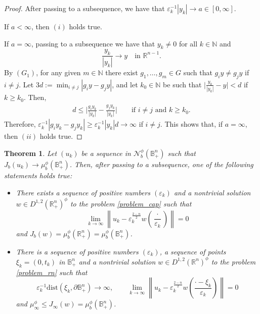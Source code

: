 \documentclass[reqno,11pt,oneside]{amsart}
\newtheorem{theorem}{Theorem}[section]
\numberwithin{equation}{section}
\def\D{\mathbb{B}^n_+}
\def\r{\mathbb{R}}
\def\rn{\mathbb{R}^n}
\def\hn{\mathbb{R}^n_+}
\def\n{\mathbb{N}}
\def\eps{\varepsilon}
\def\cN{\mathcal{N}}
\def\dist{\mathrm{dist}}
\begin{document}
\begin{proof}
After passing to a subsequence, we have that $\eps_k^{-1}|y_k|\to a\in[0,\infty]$. 

If $a<\infty$, then $(i)$ holds true. 

If $a=\infty$, passing to a subsequence we have that $y_k\neq 0$ for all $k\in\n$ and
$$\frac{y_k}{|y_k|}\to y\quad\text{in \ }\r^{n-1}.$$
By $(G_1)$, for any given $m\in\n$ there exist $g_1,\ldots,g_m\in G$ such that $g_iy\neq g_jy$ if $i\neq j$. Let $3d:=\min_{i\neq j}|g_iy-g_jy|$, and let $k_0\in\n$ be such that
$\big|\frac{y_k}{|y_k|}-y\big|<d$ if $k\geq k_0$. Then,
\begin{align*}
d\leq \Big|\frac{g_iy_k}{|y_k|}-\frac{g_jy_k}{|y_k|}\Big|\qquad\text{if \ }i\neq j\text{ \ and \ }k\geq k_0.
\end{align*}
Therefore, $\eps_k^{-1}|g_iy_k-g_jy_k|\geq\eps_k^{-1}|y_k|d\to\infty$ if $i\neq j$. This shows that, if $a=\infty$, then $(ii)$ holds true.
\end{proof}


\begin{theorem} \label{thm:minimizing}
Let $(u_k)$ be a sequence in $\cN_b^\phi(\D)$ such that $J_b(u_k)\to \mu^\phi_b(\D)$. Then, after passing to a subsequence, one of the following statements holds true:
\begin{itemize}
\item[$(I)$] There exists a sequence of positive numbers $(\eps_k)$ and a nontrivial solution $w\in D^{1,2}(\hn)^\phi$ to the problem \eqref{problem_cap} such that
$$\lim_{k\to\infty}\left\|u_k-\eps_k^\frac{2-n}{2}w\left(\frac{\cdot}{\eps_k}\right)\right\| = 0$$
and $J_b(w)=\mu^\phi_b(\hn)=\mu^\phi_b(\D)$.

\item[$(II)$] There is a sequence of positive numbers $(\eps_k)$, a sequence of points $\xi_k=(0,t_k)$ in $\D$ and a nontrivial solution $w\in D^{1,2}(\rn)^\phi$ to the problem \eqref{problem_rn} such that
$$\eps_k^{-1}\dist(\xi_k,\partial\D)\to\infty,\qquad\lim_{k\to\infty}\left\|u_k-\eps_k^\frac{2-n}{2}w\left(\frac{\cdot - \xi_k}{\eps_k}\right)\right\| = 0$$
and $\mu^\phi_\infty\leq J_\infty(w)=\mu^\phi_b(\D)$.
\end{itemize}
\end{theorem}
\end{document}
